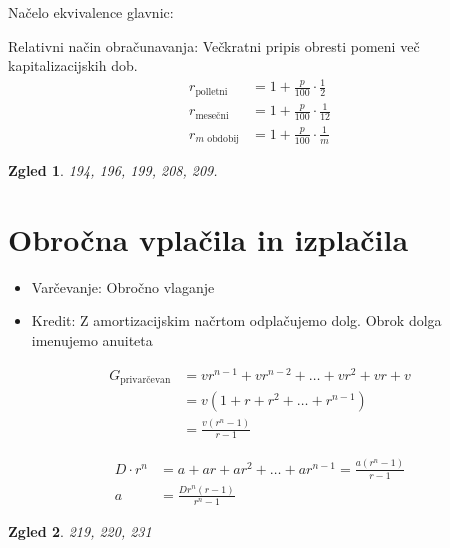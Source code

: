 \documentclass{article}
\newtheorem*{zgled}{Zgled}
\begin{document}
Načelo ekvivalence glavnic:

Relativni način obračunavanja: Večkratni pripis obresti pomeni več kapitalizacijskih dob.
\begin{align*} 
    r_\text{polletni}&=1+\frac{p}{100}\cdot\frac{1}{2}\\
    r_\text{mesečni}&=1+\frac{p}{100}\cdot\frac{1}{12}\\
    r_\text{$m$ obdobij}&=1+\frac{p}{100}\cdot\frac{1}{m}
\end{align*}

\begin{zgled}
    194, 196, 199, 208, 209.
\end{zgled}

\section{Obročna vplačila in izplačila}

\begin{itemize}
    \item Varčevanje: Obročno vlaganje
    \item Kredit: Z amortizacijskim načrtom odplačujemo dolg. Obrok dolga imenujemo anuiteta
\end{itemize}

\begin{align*}
    G_{\text{privarčevan}} &= vr^{n-1}+vr^{n-2}+\ldots+vr^2+vr+v\\
        &=v(1+r+r^2+\ldots+r^{n-1})\\
        &=\frac{v(r^n-1)}{r-1}
\end{align*} 

\begin{align*}
    D\cdot r^n &= a+ar+ar^2+\ldots+ar^{n-1}=\frac{a(r^n -1)}{r-1}\\
    a&=\frac{Dr^n (r-1)}{r^n -1}
\end{align*} 

\begin{zgled}
    219, 220, 231
\end{zgled}
\end{document}

